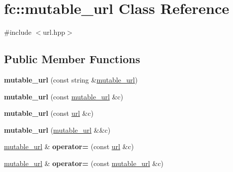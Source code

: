 \hypertarget{classfc_1_1mutable__url}{}\section{fc\+:\+:mutable\+\_\+url Class Reference}
\label{classfc_1_1mutable__url}


{\ttfamily \#include $<$url.\+hpp$>$}

\subsection*{Public Member Functions}
\begin{DoxyCompactItemize}
\item 
\mbox{\label{classfc_1_1mutable__url_a9f6a072eccebb3ae8d9c273332674075}} 
{\bfseries mutable\+\_\+url} (const string \&\mbox{\hyperlink{classfc_1_1mutable__url}{mutable\+\_\+url}})
\item 
\mbox{\label{classfc_1_1mutable__url_a0cae45785d9cdef7dcd71de637789482}} 
{\bfseries mutable\+\_\+url} (const \mbox{\hyperlink{classfc_1_1mutable__url}{mutable\+\_\+url}} \&c)
\item 
\mbox{\label{classfc_1_1mutable__url_ab45a36a27d081fc7d8830a7415280761}} 
{\bfseries mutable\+\_\+url} (const \mbox{\hyperlink{classfc_1_1url}{url}} \&c)
\item 
\mbox{\label{classfc_1_1mutable__url_a37b945e3f43136e6e96fca20a099069d}} 
{\bfseries mutable\+\_\+url} (\mbox{\hyperlink{classfc_1_1mutable__url}{mutable\+\_\+url}} \&\&c)
\item 
\mbox{\label{classfc_1_1mutable__url_a431a4ea442db379419203773f2cb5585}} 
\mbox{\hyperlink{classfc_1_1mutable__url}{mutable\+\_\+url}} \& {\bfseries operator=} (const \mbox{\hyperlink{classfc_1_1url}{url}} \&c)
\item 
\mbox{\label{classfc_1_1mutable__url_a7324a073ed4a43f636baec9504f6650e}} 
\mbox{\hyperlink{classfc_1_1mutable__url}{mutable\+\_\+url}} \& {\bfseries operator=} (const \mbox{\hyperlink{classfc_1_1mutable__url}{mutable\+\_\+url}} \&c)
\item 

\end{DoxyCompactItemize}
